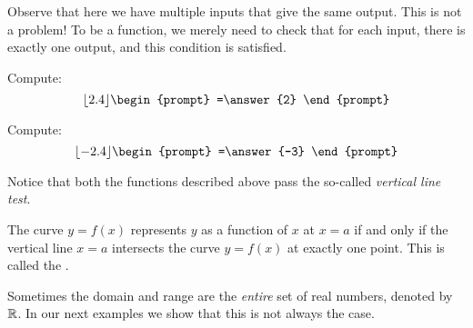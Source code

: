 \documentclass{ximera}
\begin{document}
\begin{example}
\begin{image}
\end{image}
Observe that here we have multiple inputs that give
the same output.  This is not a problem! To be a function, we
merely need to check that for each input, there is exactly one output,
and this condition is satisfied.
\end{example}

\begin{question}
  Compute:
  \[
  \lfloor 2.4 \rfloor
  \begin{prompt}
    =\answer{2}
  \end{prompt}
  \]
  \begin{question}
  Compute:
  \[
  \lfloor -2.4 \rfloor
  \begin{prompt}
    =\answer{-3}
  \end{prompt}
  \]
\end{question}
\end{question}


Notice that both the functions described above pass the so-called
\textit{vertical line test}.

\begin{theorem}
The curve $y=f(x)$ represents $y$ as a function of $x$ at $x=a$ if and
only if the vertical line $x=a$ intersects the curve $y=f(x)$ at
exactly one point. This is called the .
\end{theorem}

Sometimes the domain and range are the \textit{entire} set of real
numbers, denoted by $\mathbb R$. In our next examples we show that this is
not always the case.
\end{document}
